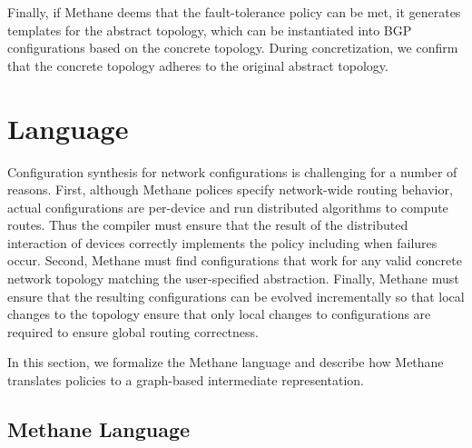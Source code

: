 \documentclass[numbers, 10pt, preprint]{sigplanconf}
\newcommand{\sysname}{{\small \sf Methane}\xspace}
\begin{document}
Finally, if \sysname deems that the fault-tolerance policy can be met, it generates templates for the abstract topology, which can be instantiated into BGP configurations based on the concrete topology. During concretization, we confirm that the concrete topology adheres to the original abstract topology.

%
%
%


%
%
%
%

\section{Language}
\label{sec:language}

Configuration synthesis for network configurations is challenging for a number of reasons. First, although \sysname polices specify network-wide routing behavior, actual configurations are per-device and run distributed algorithms to compute routes. Thus the compiler must ensure that the result of the distributed interaction of devices correctly implements the policy including when failures occur. Second, \sysname must find configurations that work for any valid concrete network topology matching the user-specified abstraction. Finally, \sysname must ensure that the resulting configurations can be evolved incrementally so that local changes to the topology ensure that only local changes to configurations are required to ensure global routing correctness.

In this section, we formalize the \sysname language and describe how \sysname translates policies to a graph-based intermediate representation.

\subsection{Methane Language}
\end{document}
